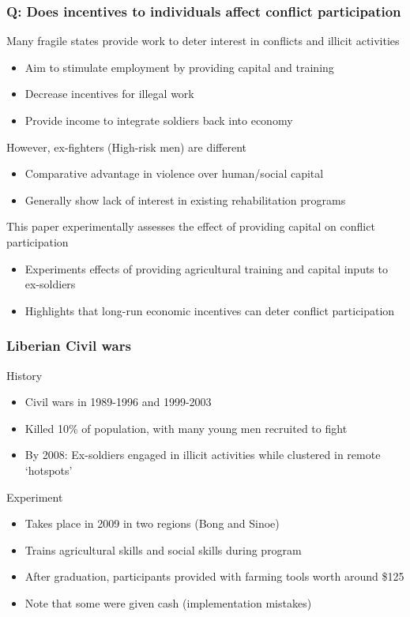 \documentclass[aspectratio=169]{beamer}
\begin{document}
\begin{frame}
\frametitle{Q: Does incentives to individuals affect conflict participation} 
Many fragile states provide work to deter interest in conflicts and illicit activities
\begin{itemize}\setlength\itemsep{3pt}
\item Aim to stimulate employment by providing capital and training 
\item Decrease incentives for illegal work
\item Provide income to integrate soldiers back into economy
\end{itemize} \medskip
However, ex-fighters (High-risk men) are different
\begin{itemize}\setlength\itemsep{3pt}
\item Comparative advantage in violence over human/social capital
\item Generally show lack of interest in existing rehabilitation programs
\end{itemize}\medskip
This paper experimentally assesses the effect of providing capital on conflict participation
\begin{itemize}\setlength\itemsep{3pt}
\item Experiments effects of providing agricultural training and capital inputs to ex-soldiers
\item Highlights that long-run economic incentives can deter conflict participation
\end{itemize}\medskip
\end{frame}

\begin{frame}
\frametitle{Liberian Civil wars} 
History
\begin{itemize}\setlength\itemsep{3pt}
\item Civil wars in 1989-1996 and 1999-2003
\item Killed 10\% of population, with many young men recruited to fight
\item By 2008: Ex-soldiers engaged in illicit activities while clustered in remote `hotspots'
\end{itemize} \medskip
Experiment
\begin{itemize}\setlength\itemsep{3pt}
\item Takes place in 2009 in two regions (Bong and Sinoe)
\item Trains agricultural skills and social skills during program
\item After graduation, participants provided with farming tools worth around \$125 
\item Note that some were given cash (implementation mistakes)
\end{itemize}\medskip
\end{frame}
\end{document}
